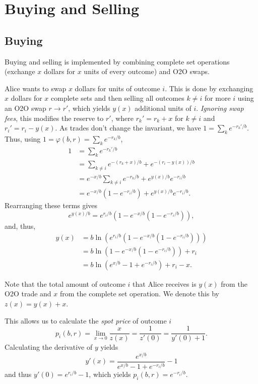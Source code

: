 \documentclass[12pt]{article}
\begin{document}
\section{Buying and Selling}

\subsection{Buying}

Buying and selling is implemented by combining complete set operations (exchange $x$ dollars for $x$ units of every outcome) and O2O swaps.

Alice wants to swap $x$ dollars for units of outcome $i$. This is done by exchanging $x$ dollars for $x$ complete sets and then selling all outcomes $k \neq i$ for more $i$ using an O2O swap $r \rightarrow r'$, which yields $y(x)$ additional units of $i$. \emph{Ignoring swap fees}, this modifies the reserve to $r'$, where $r_k' = r_k + x$ for $k \neq i$ and $r_i' = r_i - y(x)$. As trades don't change the invariant, we have $1 = \sum_k e^{-r_k'/b}$. Thus, using $1 = \varphi(b, r) = \sum_k e^{-r_k/b}$,
\begin{align*}
    1 &= \sum_k e^{-r_k'/b} \\
    &= \sum_{k \neq i} e^{-(r_k + x)/b} + e^{-(r_i-y(x))/b} \\
    &= e^{-x/b} \sum_{k \neq i} e^{-r_k/b} + e^{y(x)/b} e^{-r_i/b} \\
    &= e^{-x/b} (1 - e^{-r_i/b}) + e^{y(x)/b} e^{-r_i/b}.
\end{align*}
Rearranging these terms gives
\[
    e^{y(x)/b} = e^{r_i/b} (1 - e^{-x/b}(1 - e^{-r_i/b})),
\]
and, thus,
\begin{align*}
    y(x) &= b \ln(e^{r_i/b} (1 - e^{-x/b}(1 - e^{-r_i/b}))) \\
    &= b \ln (1 - e^{-x/b}(1 - e^{-r_i/b})) + r_i \\
    &= b \ln (e^{x/b} - 1 + e^{-r_i/b}) + r_i - x.
\end{align*}

Note that the total amount of outcome $i$ that Alice receives is $y(x)$ from the O2O trade and $x$ from the complete set operation. We denote this by $z(x) = y(x) + x$.

This allows us to calculate the \emph{spot price} of outcome $i$
\[
    p_i(b, r) = \lim_{x \rightarrow 0} \frac{x}{z(x)} = \frac{1}{z'(0)} = \frac{1}{y'(0) + 1}.
\]
Calculating the derivative of $y$ yields
\[
    y'(x) = \frac{e^{x/b}}{e^{x/b} - 1 + e^{-r_i/b}} - 1
\]
and thus $y'(0) = e^{r_i/b} - 1$, which yields $p_i(b, r) = e^{-r_i/b}$.
\end{document}
